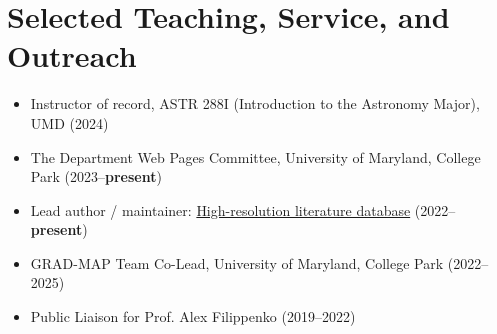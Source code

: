 \documentclass[letterpaper,11pt]{article}
\newcommand{\resumeItem}[2]{
  \item\small{
    \textbf{#1}{#2 \vspace{-2pt}}
  }
}
\newcommand{\resumeSubHeadingListStart}{\begin{itemize}[leftmargin=*]}
\newcommand{\resumeItemListStart}{\begin{itemize}}
\newcommand{\resumeItemListEnd}{\end{itemize}\vspace{-5pt}}
\newcommand{\shorterSection}[1]{\vspace{-10pt}\section{#1}}
\begin{document}
  





\shorterSection{Selected Teaching, Service, and Outreach}
\resumeItemListStart
\resumeItem{}{Instructor of record, ASTR 288I (Introduction to the Astronomy Major), UMD (2024)}
\resumeItem{}{The Department Web Pages Committee, University of Maryland, College Park (2023--\textbf{present})}
\resumeItem{}{Lead author / maintainer: \href{https://www.arjunsavel.com/hires_papers.html}{High-resolution literature database} (2022--\textbf{present})}
\resumeItem{}{GRAD-MAP Team Co-Lead, University of Maryland, College Park (2022--2025)}
\resumeItem{}{Public Liaison for Prof. Alex Filippenko (2019--2022)}
\resumeItemListEnd






\end{document}
